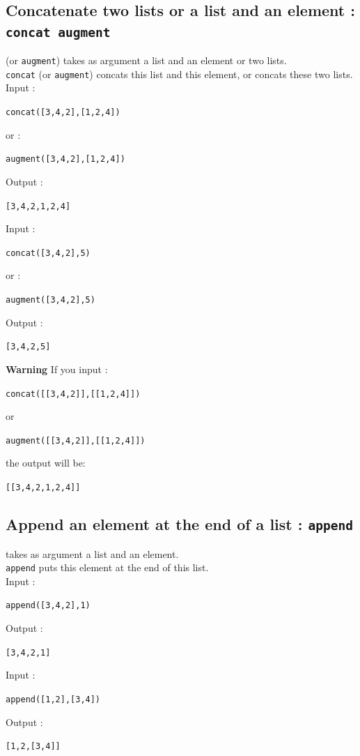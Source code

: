 \documentclass[a4paper,11pt]{book}
\begin{document}
\subsection{Concatenate two lists or a list and an element : {\tt concat augment}}
 (or {\tt augment}) takes as argument a list and an 
element or two lists.\\
{\tt concat} (or {\tt augment}) concats this list and this element, or concats 
these two lists.\\
Input :
\begin{center}{\tt concat([3,4,2],[1,2,4])}\end{center}
or :
\begin{center}{\tt augment([3,4,2],[1,2,4])}\end{center}
Output :
\begin{center}{\tt [3,4,2,1,2,4]}\end{center}
Input :
\begin{center}{\tt concat([3,4,2],5)}\end{center}
or :
\begin{center}{\tt augment([3,4,2],5)}\end{center}
Output :
\begin{center}{\tt [3,4,2,5]}\end{center}
{\bf Warning}
If you input :
\begin{center}{\tt concat([[3,4,2]],[[1,2,4]])}\end{center}
or
\begin{center}{\tt augment([[3,4,2]],[[1,2,4]])}\end{center}
the output will be:
\begin{center}{\tt [[3,4,2,1,2,4]]}\end{center}

\subsection{Append an element at the end of a list : {\tt append}}
 takes as argument a list and an element.\\
{\tt append} puts this element at the end of this list.\\
Input :
\begin{center}{\tt append([3,4,2],1)}\end{center}
Output :
\begin{center}{\tt  [3,4,2,1]}\end{center}
Input :
\begin{center}{\tt append([1,2],[3,4])}\end{center}
Output :
\begin{center}{\tt [1,2,[3,4]]}\end{center}
\end{document}
